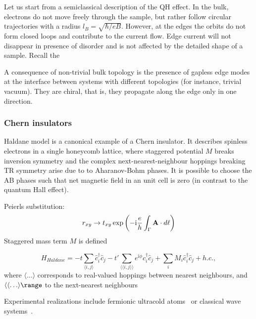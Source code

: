{Let us start from a semiclassical description of the QH effect. In the bulk, electrons do not move freely through the sample, but rather follow circular trajectories with a radius $l_B = \sqrt{\hbar / eB}$. However, at the edges the orbits do not form closed loops and contribute to the current flow. Edge current will not disappear in presence of disorder and is not affected by the detailed shape of a sample. Recall the 





A consequence of non-trivial bulk topology is the presence of gapless edge modes at the interface between systems with different topologies (for instance, trivial vacuum). They are chiral, that is, they propagate along the edge only in one direction.

\subsubsection{Chern insulators}
Haldane model is a canonical example of a Chern insulator. It describes spinless electrons in a single honeycomb lattice, where staggered potential $M$ breaks inversion symmetry and the complex next-nearest-neighbour hoppings breaking TR symmetry arise due to to Aharanov-Bohm phases. It is possible to choose the AB phases such that net magnetic field in an unit cell is zero (in contrast to the quantum Hall effect).




Peierls substitution:
\begin{equation}
r_{xy} \rightarrow t_{xy} \exp \left( -\textnormal{i} \frac{e}{h} \int_{\Gamma} \mathbf{A} \cdot d \ell \right)
\label{eq:peierls}
\end{equation}
Staggered mass term $M$ is defined 



\begin{equation}
H_{Haldane} = -t \sum_{\langle i, j \rangle} \hat{c}^{\dagger}_i \hat{c}_j - t' \sum_{\langle \langle i, j \rangle \rangle} e^{\mathrm{i} \phi} \hat{c}^{\dagger}_i \hat{c}_j  + \sum_i M_i \hat{c}^{\dagger}_i \hat{c}_j  + h. c.,
\end{equation}
where $ \langle \ldots \rangle$ corresponds to real-valued hoppings between nearest neighbours, and $ \langle \langle \ldots \rangle \range$ to the next-nearest neighbours


Experimental realizations include fermionic ultracold atoms~\cite{Jotzu2014} or classical wave systems~\cite{CIacustic2019}.
}

